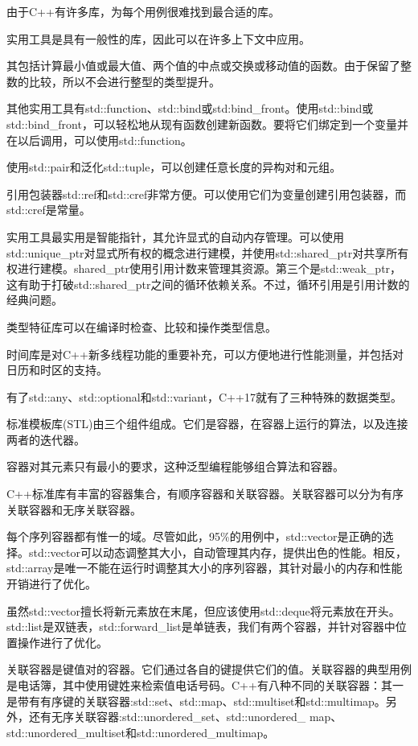 由于C++有许多库，为每个用例很难找到最合适的库。


实用工具是具有一般性的库，因此可以在许多上下文中应用。

其包括计算最小值或最大值、两个值的中点或交换或移动值的函数。由于保留了整数的比较，所以不会进行整型的类型提升。

其他实用工具有std::function、std::bind或std:bind\_front。使用std::bind或std::bind\_front，可以轻松地从现有函数创建新函数。要将它们绑定到一个变量并在以后调用，可以使用std::function。

使用std::pair和泛化std::tuple，可以创建任意长度的异构对和元组。

引用包装器std::ref和std::cref非常方便。可以使用它们为变量创建引用包装器，而std::cref是常量。

实用工具最实用是智能指针，其允许显式的自动内存管理。可以使用std::unique\_ptr对显式所有权的概念进行建模，并使用std::shared\_ptr对共享所有权进行建模。shared\_ptr使用引用计数来管理其资源。第三个是std::weak\_ptr，这有助于打破std::shared\_ptr之间的循环依赖关系。不过，循环引用是引用计数的经典问题。

类型特征库可以在编译时检查、比较和操作类型信息。

时间库是对C++新多线程功能的重要补充，可以方便地进行性能测量，并包括对日历和时区的支持。

有了std::any、std::optional和std::variant，C++17就有了三种特殊的数据类型。



标准模板库(STL)由三个组件组成。它们是容器，在容器上运行的算法，以及连接两者的迭代器。

容器对其元素只有最小的要求，这种泛型编程能够组合算法和容器。

C++标准库有丰富的容器集合，有顺序容器和关联容器。关联容器可以分为有序关联容器和无序关联容器。

每个序列容器都有惟一的域。尽管如此，95\%的用例中，std::vector是正确的选择。std::vector可以动态调整其大小，自动管理其内存，提供出色的性能。相反，std::array是唯一不能在运行时调整其大小的序列容器，其针对最小的内存和性能开销进行了优化。

虽然std::vector擅长将新元素放在末尾，但应该使用std::deque将元素放在开头。std::list是双链表，std::forward\_list是单链表，我们有两个容器，并针对容器中位置操作进行了优化。

关联容器是键值对的容器。它们通过各自的键提供它们的值。关联容器的典型用例是电话簿，其中使用键姓来检索值电话号码。C++有八种不同的关联容器：其一是带有有序键的关联容器:std::set、std::map、std::multiset和std::multimap。另外，还有无序关联容器:std::unordered\_set、std::unordered\_ map、std::unordered\_multiset和std::unordered\_multimap。


